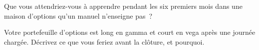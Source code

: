 \begin{interviewq}\label{iq:in:the-options-market-making-houses:5}
Que vous attendriez-vous à apprendre pendant les six premiers mois dans une maison d'options qu'un manuel n'enseigne pas~?
\end{interviewq}

\begin{interviewq}\label{iq:in:the-options-market-making-houses:6}
Votre portefeuille d'options est long en gamma et court en vega après une journée chargée. Décrivez ce que vous feriez avant la clôture, et pourquoi.
\end{interviewq}
